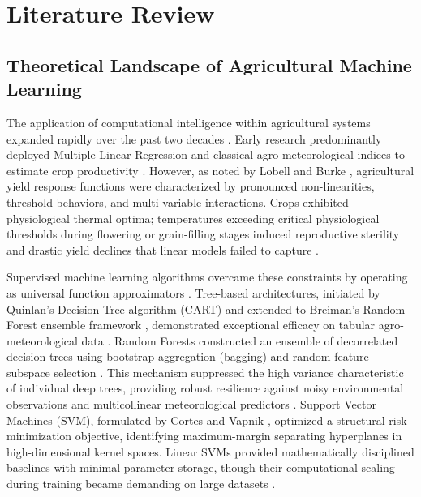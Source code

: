 \documentclass[conference]{IEEEtran}
\begin{document}
\section{Literature Review}

\subsection{Theoretical Landscape of Agricultural Machine Learning}
The application of computational intelligence within agricultural systems expanded rapidly over the past two decades \cite{dhakal2023, crane2018, fernandez2021}. Early research predominantly deployed Multiple Linear Regression and classical agro-meteorological indices to estimate crop productivity \cite{demartonne1926, hoerl1970}. However, as noted by Lobell and Burke \cite{lobell2008}, agricultural yield response functions were characterized by pronounced non-linearities, threshold behaviors, and multi-variable interactions. Crops exhibited physiological thermal optima; temperatures exceeding critical physiological thresholds during flowering or grain-filling stages induced reproductive sterility and drastic yield declines that linear models failed to capture \cite{schlenker2009}.

Supervised machine learning algorithms overcame these constraints by operating as universal function approximators \cite{hastie2009}. Tree-based architectures, initiated by Quinlan's Decision Tree algorithm (CART) \cite{quinlan1986} and extended to Breiman's Random Forest ensemble framework \cite{breiman2001}, demonstrated exceptional efficacy on tabular agro-meteorological data \cite{dhakal2023}. Random Forests constructed an ensemble of decorrelated decision trees using bootstrap aggregation (bagging) and random feature subspace selection \cite{breiman2001}. This mechanism suppressed the high variance characteristic of individual deep trees, providing robust resilience against noisy environmental observations and multicollinear meteorological predictors \cite{breiman2001, hastie2009}. Support Vector Machines (SVM), formulated by Cortes and Vapnik \cite{cortes1995}, optimized a structural risk minimization objective, identifying maximum-margin separating hyperplanes in high-dimensional kernel spaces. Linear SVMs provided mathematically disciplined baselines with minimal parameter storage, though their computational scaling during training became demanding on large datasets \cite{cortes1995, hastie2009}.
\end{document}
